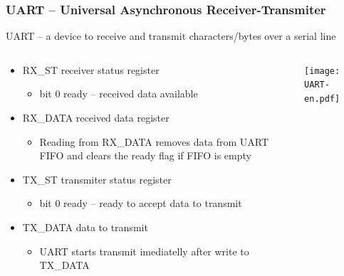 \documentclass{beamer}
\begin{document}
\begin{frame}
\frametitle{UART -- Universal Asynchronous Receiver-Transmiter}

UART -- a device to receive and transmit characters/bytes over a serial line

\begin{columns}
\begin{column}{0.55\textwidth}
\begin{itemize}
  \item RX\_ST receiver status register
  \begin{itemize}
  \item bit 0 ready -- received data available
  \end{itemize}
  \item RX\_DATA received data register
  \begin{itemize}
  \item Reading from RX\_DATA removes data from UART FIFO and clears the ready flag if FIFO is empty
  \end{itemize}
  \item TX\_ST transmiter status register
  \begin{itemize}
  \item bit 0 ready -- ready to accept data to transmit
  \end{itemize}
  \item TX\_DATA data to transmit
  \begin{itemize}
  \item UART starts transmit imediatelly after write to TX\_DATA
  \end{itemize}
\end{itemize}
\end{column}
\begin{column}{0.45\textwidth}
\texttt{[image: UART-en.pdf]}
\end{column}
\end{columns}

\end{frame}
\end{document}
